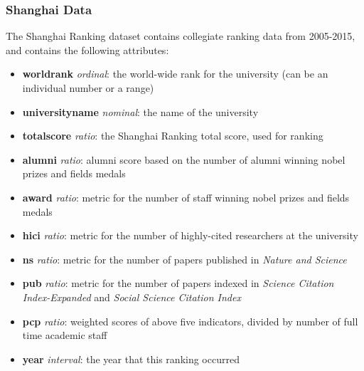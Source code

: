 \documentclass[12pt]{article}
\begin{document}
\subsubsection{Shanghai Data}
The Shanghai Ranking dataset contains collegiate ranking data from 2005-2015, and contains the following attributes:
\begin{itemize}
\item \textbf{world\textunderscore rank} \textit{ordinal}: the world-wide rank for the university (can be an individual number or a range)
\item \textbf{university\textunderscore name} \textit{nominal}: the name of the university
\item \textbf{total\textunderscore score} \textit{ratio}: the Shanghai Ranking total score, used for ranking
\item \textbf{alumni} \textit{ratio}: alumni score based on the number of alumni winning nobel prizes and fields medals
\item \textbf{award} \textit{ratio}: metric for the number of staff winning nobel prizes and fields medals
\item \textbf{hici} \textit{ratio}: metric for the number of highly-cited researchers at the university
\item \textbf{ns} \textit{ratio}: metric for the number of papers published in \textit{Nature and Science}
\item \textbf{pub} \textit{ratio}: metric for the number of papers indexed in \textit{Science Citation Index-Expanded} and \textit{Social Science Citation Index}
\item \textbf{pcp} \textit{ratio}: weighted scores of above five indicators, divided by number of full time academic staff
\item \textbf{year} \textit{interval}: the year that this ranking occurred
\end{itemize}
\end{document}
